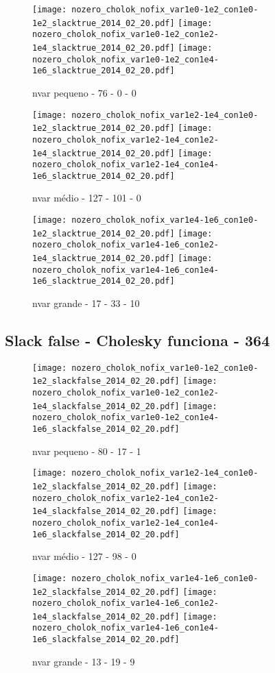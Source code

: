 \documentclass{article}
\begin{document}
\begin{figure}[H]
  \centering
  \texttt{[image: nozero\_cholok\_nofix\_var1e0-1e2\_con1e0-1e2\_slacktrue\_2014\_02\_20.pdf]}
  \texttt{[image: nozero\_cholok\_nofix\_var1e0-1e2\_con1e2-1e4\_slacktrue\_2014\_02\_20.pdf]}
  \texttt{[image: nozero\_cholok\_nofix\_var1e0-1e2\_con1e4-1e6\_slacktrue\_2014\_02\_20.pdf]}
  \caption{ nvar pequeno - 76 - 0 - 0 }
\end{figure}
\begin{figure}[H]
  \centering
  \texttt{[image: nozero\_cholok\_nofix\_var1e2-1e4\_con1e0-1e2\_slacktrue\_2014\_02\_20.pdf]}
  \texttt{[image: nozero\_cholok\_nofix\_var1e2-1e4\_con1e2-1e4\_slacktrue\_2014\_02\_20.pdf]}
  \texttt{[image: nozero\_cholok\_nofix\_var1e2-1e4\_con1e4-1e6\_slacktrue\_2014\_02\_20.pdf]}
  \caption{ nvar médio - 127 - 101 - 0}
\end{figure}
\begin{figure}[H]
  \centering
  \texttt{[image: nozero\_cholok\_nofix\_var1e4-1e6\_con1e0-1e2\_slacktrue\_2014\_02\_20.pdf]}
  \texttt{[image: nozero\_cholok\_nofix\_var1e4-1e6\_con1e2-1e4\_slacktrue\_2014\_02\_20.pdf]}
  \texttt{[image: nozero\_cholok\_nofix\_var1e4-1e6\_con1e4-1e6\_slacktrue\_2014\_02\_20.pdf]}
  \caption{ nvar grande - 17 - 33 - 10}
\end{figure}

\newpage
\subsection{Slack false - Cholesky funciona - 364 }

\begin{figure}[H]
  \centering
  \texttt{[image: nozero\_cholok\_nofix\_var1e0-1e2\_con1e0-1e2\_slackfalse\_2014\_02\_20.pdf]}
  \texttt{[image: nozero\_cholok\_nofix\_var1e0-1e2\_con1e2-1e4\_slackfalse\_2014\_02\_20.pdf]}
  \texttt{[image: nozero\_cholok\_nofix\_var1e0-1e2\_con1e4-1e6\_slackfalse\_2014\_02\_20.pdf]}
  \caption{ nvar pequeno - 80 - 17 - 1}
\end{figure}
\begin{figure}[H]
  \centering
  \texttt{[image: nozero\_cholok\_nofix\_var1e2-1e4\_con1e0-1e2\_slackfalse\_2014\_02\_20.pdf]}
  \texttt{[image: nozero\_cholok\_nofix\_var1e2-1e4\_con1e2-1e4\_slackfalse\_2014\_02\_20.pdf]}
  \texttt{[image: nozero\_cholok\_nofix\_var1e2-1e4\_con1e4-1e6\_slackfalse\_2014\_02\_20.pdf]}
  \caption{ nvar médio - 127 - 98 - 0}
\end{figure}
\begin{figure}[H]
  \centering
  \texttt{[image: nozero\_cholok\_nofix\_var1e4-1e6\_con1e0-1e2\_slackfalse\_2014\_02\_20.pdf]}
  \texttt{[image: nozero\_cholok\_nofix\_var1e4-1e6\_con1e2-1e4\_slackfalse\_2014\_02\_20.pdf]}
  \texttt{[image: nozero\_cholok\_nofix\_var1e4-1e6\_con1e4-1e6\_slackfalse\_2014\_02\_20.pdf]}
  \caption{ nvar grande - 13 - 19 - 9}
\end{figure}
\end{document}
